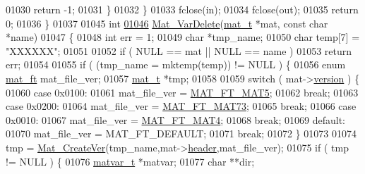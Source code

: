 \begin{DoxyCode}
{{{{{{{{{{{{{{{{{{{{{{{{{01030             \textcolor{keywordflow}{return} -1;
01031         \}
01032     \}
01033     fclose(in);
01034     fclose(out);
01035     \textcolor{keywordflow}{return} 0;
01036 \}
01037 
01045 \textcolor{keywordtype}{int}
\hyperlink{group___m_a_t_gabf139e48d48177e5069338fa2919c60a}{01046} \hyperlink{group___m_a_t_gabf139e48d48177e5069338fa2919c60a}{Mat\_VarDelete}(\hyperlink{struct__mat__t}{mat\_t} *mat, \textcolor{keyword}{const} \textcolor{keywordtype}{char} *name)
01047 \{
01048     \textcolor{keywordtype}{int}   err = 1;
01049     \textcolor{keywordtype}{char} *tmp\_name;
01050     \textcolor{keywordtype}{char} temp[7] = \textcolor{stringliteral}{"XXXXXX"};
01051 
01052     \textcolor{keywordflow}{if} ( NULL == mat || NULL == name )
01053         \textcolor{keywordflow}{return} err;
01054 
01055     \textcolor{keywordflow}{if} ( (tmp\_name = mktemp(temp)) != NULL ) \{
01056         \textcolor{keyword}{enum} \hyperlink{group___m_a_t_gad03442b8378999189d510e3745c702b7}{mat\_ft} mat\_file\_ver;
01057         \hyperlink{struct__mat__t}{mat\_t} *tmp;
01058 
01059         \textcolor{keywordflow}{switch} ( mat->\hyperlink{struct__mat__t_a729c2bc0afc97485057a5af425635b1a}{version} ) \{
01060             \textcolor{keywordflow}{case} 0x0100:
01061                 mat\_file\_ver = \hyperlink{group___m_a_t_ggad03442b8378999189d510e3745c702b7a31ade1f6989411dc0299007e2c7d33b2}{MAT\_FT\_MAT5};
01062                 \textcolor{keywordflow}{break};
01063             \textcolor{keywordflow}{case} 0x0200:
01064                 mat\_file\_ver = \hyperlink{group___m_a_t_ggad03442b8378999189d510e3745c702b7a765c5d1d5038947646260dc82483517e}{MAT\_FT\_MAT73};
01065                 \textcolor{keywordflow}{break};
01066             \textcolor{keywordflow}{case} 0x0010:
01067                 mat\_file\_ver = \hyperlink{group___m_a_t_ggad03442b8378999189d510e3745c702b7a858b4f5da65548219b1c3ad47aa478d3}{MAT\_FT\_MAT4};
01068                 \textcolor{keywordflow}{break};
01069             \textcolor{keywordflow}{default}:
01070                 mat\_file\_ver = MAT\_FT\_DEFAULT;
01071                 \textcolor{keywordflow}{break};
01072         \}
01073 
01074         tmp = \hyperlink{group___m_a_t_ga22d404f203af7869c841400e7ad247cf}{Mat\_CreateVer}(tmp\_name,mat->\hyperlink{struct__mat__t_a5ed5d0e4e3c4d76b626a8a1772d579c4}{header},mat\_file\_ver);
01075         \textcolor{keywordflow}{if} ( tmp != NULL ) \{
01076             \hyperlink{group___m_a_t_structmatvar__t}{matvar\_t} *matvar;
01077             \textcolor{keywordtype}{char} **dir;
}}}}}}}}}}}}}}}}}}}}}}}}}
\end{DoxyCode}
